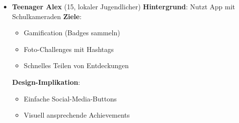 \documentclass[10pt]{article}
\begin{document}
\begin{itemize}
	\item \textbf{Teenager Alex} (15, lokaler Jugendlicher)
	\subitem \textbf{Hintergrund}: Nutzt App mit Schulkameraden
	\subitem \textbf{Ziele}: 
	\begin{itemize}
		\item Gamification (Badges sammeln)
		\item Foto-Challenges mit Hashtags
		\item Schnelles Teilen von Entdeckungen
	\end{itemize}
	\subitem \textbf{Design-Implikation}: 
	\begin{itemize}
		\item Einfache Social-Media-Buttons
		\item Visuell ansprechende Achievements
	\end{itemize}
\end{itemize}
\end{document}

